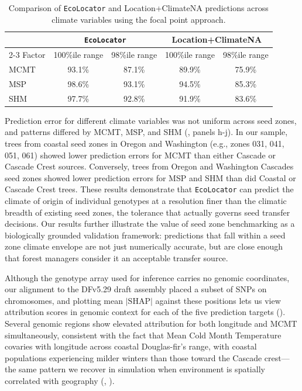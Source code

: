 \documentclass[]{article}
\newcommand{\dfir}{Douglas-fir\xspace}
\newcommand{\ecolocator}{\texttt{EcoLocator}\xspace}
\begin{document}
\begin{table}[ht]
  \centering
  \caption{Comparison of \ecolocator and Location+ClimateNA predictions across climate variables using the focal point approach.} %
  \label{tab:table2}
  \begin{tabular}{lcccc}
  \hline
   & \multicolumn{2}{c}{\ecolocator} & \multicolumn{2}{c}{Location+ClimateNA} \\
  \cline{2-3} \cline{4-5}
  Factor & 100\%ile range & 98\%ile range & 100\%ile range & 98\%ile range \\
  \hline
  MCMT & 93.1\% & 87.1\% & 89.9\% & 75.9\% \\
  MSP  & 98.6\% & 93.1\% & 94.5\% & 85.3\% \\
  SHM  & 97.7\% & 92.8\% & 91.9\% & 83.6\% \\
  \hline
  \end{tabular}
\end{table}

Prediction error for different climate variables was not uniform across seed zones,
and patterns differed by MCMT, MSP, and SHM
(, panels h-j). In our sample, trees from coastal seed 
zones in Oregon and Washington (e.g., zones 031, 041, 051, 061) showed lower prediction
errors for MCMT than either Cascade or Cascade Crest sources.
Conversely, trees from Oregon and Washington Cascades seed zones showed
lower prediction errors for MSP and SHM than did Coastal or Cascade Crest trees. 
These results demonstrate that \ecolocator
can predict the climate of origin of individual genotypes
at a resolution finer than the climatic breadth of existing seed zones,
the tolerance that actually governs seed transfer decisions.
Our results further illustrate the value of seed zone benchmarking
as a biologically grounded validation framework:
predictions that fall within a seed zone climate envelope
are not just numerically accurate,
but are close enough that forest managers
consider it an acceptable transfer source.

Although the genotype array used for inference carries no genomic coordinates,
our alignment to the DFv5.29 draft assembly placed a subset of SNPs
on chromosomes, and plotting mean $\lvert\mathrm{SHAP}\rvert$ against these positions
lets us view attribution scores in genomic context for each of the
five prediction targets ().
Several genomic regions show elevated attribution for both longitude and 
MCMT simultaneously, consistent with the fact that Mean Cold Month
Temperature covaries with longitude across coastal \dfir's range, 
with coastal populations experiencing milder winters than those toward 
the Cascade crest---the same pattern we recover in simulation when 
environment is spatially correlated with geography (, ). 
\end{document}
